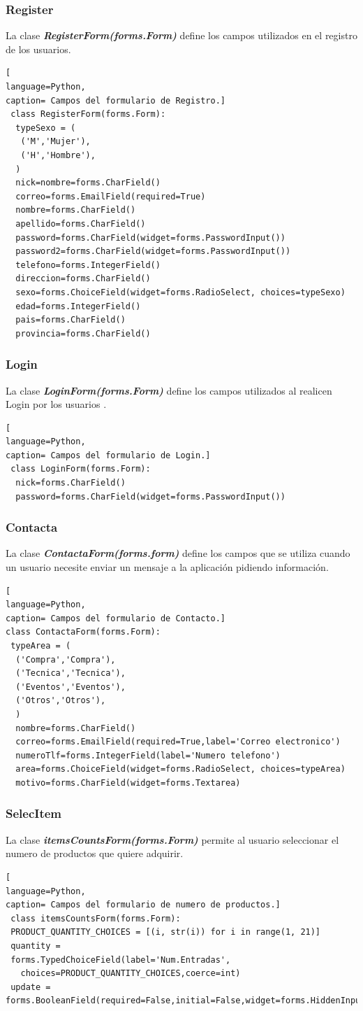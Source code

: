\subsubsection*{Register}
La clase \textit{\textbf{RegisterForm(forms.Form)}} define los campos utilizados en el registro de los usuarios.
\begin{lstlisting}[
language=Python,
caption= Campos del formulario de Registro.]
 class RegisterForm(forms.Form):
  typeSexo = (
   ('M','Mujer'),
   ('H','Hombre'),
  )
  nick=nombre=forms.CharField()
  correo=forms.EmailField(required=True)
  nombre=forms.CharField()
  apellido=forms.CharField()
  password=forms.CharField(widget=forms.PasswordInput())
  password2=forms.CharField(widget=forms.PasswordInput())
  telefono=forms.IntegerField()
  direccion=forms.CharField()
  sexo=forms.ChoiceField(widget=forms.RadioSelect, choices=typeSexo)
  edad=forms.IntegerField()
  pais=forms.CharField()
  provincia=forms.CharField()
\end{lstlisting}
\subsubsection*{Login}
La clase \textit{\textbf{LoginForm(forms.Form)}} define los campos utilizados al realicen Login por los usuarios .
\begin{lstlisting}[
language=Python,
caption= Campos del formulario de Login.]
 class LoginForm(forms.Form):
  nick=forms.CharField()
  password=forms.CharField(widget=forms.PasswordInput())
\end{lstlisting}
\subsubsection*{Contacta}
La clase \textit{\textbf{ ContactaForm(forms.form)}} define los campos que se utiliza cuando un usuario necesite enviar un mensaje a la aplicación pidiendo información.
\begin{lstlisting}[
language=Python,
caption= Campos del formulario de Contacto.]
class ContactaForm(forms.Form):
 typeArea = (
  ('Compra','Compra'),
  ('Tecnica','Tecnica'),
  ('Eventos','Eventos'),
  ('Otros','Otros'),
  )
  nombre=forms.CharField()
  correo=forms.EmailField(required=True,label='Correo electronico')
  numeroTlf=forms.IntegerField(label='Numero telefono')
  area=forms.ChoiceField(widget=forms.RadioSelect, choices=typeArea)
  motivo=forms.CharField(widget=forms.Textarea)
\end{lstlisting}
\subsubsection*{SelecItem}
La clase \textit{\textbf{itemsCountsForm(forms.Form)}} permite al usuario seleccionar el numero de productos que quiere adquirir.
\begin{lstlisting}[
language=Python,
caption= Campos del formulario de numero de productos.]
 class itemsCountsForm(forms.Form):
 PRODUCT_QUANTITY_CHOICES = [(i, str(i)) for i in range(1, 21)]
 quantity =
 forms.TypedChoiceField(label='Num.Entradas',
   choices=PRODUCT_QUANTITY_CHOICES,coerce=int)
 update = forms.BooleanField(required=False,initial=False,widget=forms.HiddenInput)
\end{lstlisting}
